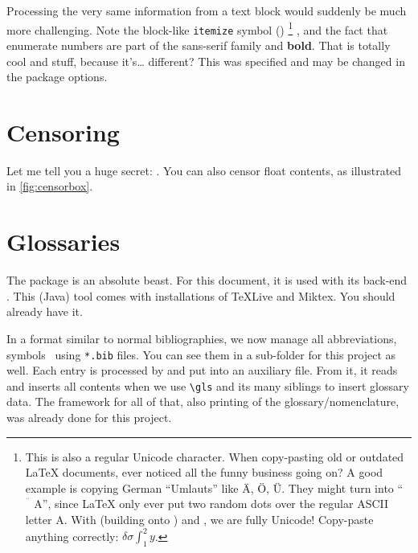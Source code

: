 Processing the very same information from a text block would suddenly be much more challenging.
Note the block-like \texttt{itemize} symbol (\smblksquare{})%
\footnote{%
	This is also a regular Unicode character.
	When copy-pasting old or outdated \LaTeX{} documents, ever noticed all the funny business going on?
	A good example is copying German \enquote{Umlauts} like Ä, Ö, Ü.
	They might turn into \enquote{\(\ddot{\phantom{A}}\text{A}\)}, since \LaTeX{} only ever put two random dots over the regular ASCII letter A.
	With  (building onto ) and , we are fully Unicode!
	Copy-paste anything correctly: \(\delta \sigma \int_{1}^{2} y\).
}
, and the fact that enumerate numbers are part of the {\sffamily sans-serif family} and \textbf{bold}.
That is totally cool and stuff, because it's\dots{} different?
This was specified and may be changed in the  package options.
\section{Censoring}
Let me tell you a huge secret:  .
You can also censor float contents, as illustrated in \cref{fig:censorbox}.
\begin{figure}
	{%
	}
\end{figure}
\section{Glossaries}
The package  is an absolute beast.
For this document, it is used with its back-end .
This (Java) tool comes with installations of TeXLive and Miktex.
You should already have it.

In a format similar to normal bibliographies, we now manage all abbreviations, symbols \ using \texttt{*.bib} files.
You can see them in a sub-folder for this project as well.
Each entry is processed by  and put into an auxiliary file.
From it, it reads and inserts all contents when we use \verb|\gls| and its many siblings to insert glossary data.
The framework for all of that, also printing of the glossary/nomenclature, was already done for this project.

